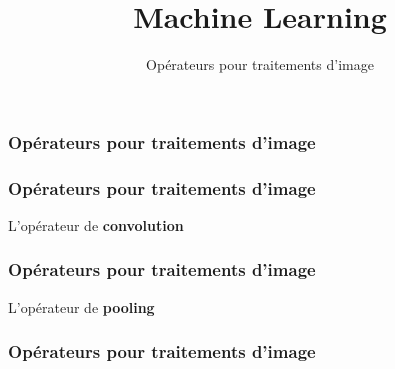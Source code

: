 \documentclass{formation}
\title{Machine Learning}
\subtitle{Opérateurs pour traitements d'image}
\begin{document}
\maketitle

\begin{frame}
  \frametitle{Opérateurs pour traitements d'image}
\end{frame}

\begin{frame}
  \frametitle{Opérateurs pour traitements d'image}
  L'opérateur de \textbf{convolution}
\end{frame}

\begin{frame}
  \frametitle{Opérateurs pour traitements d'image}
  L'opérateur de \textbf{pooling}
\end{frame}

\begin{frame}
  \frametitle{Opérateurs pour traitements d'image}
\end{frame}
\end{document}
